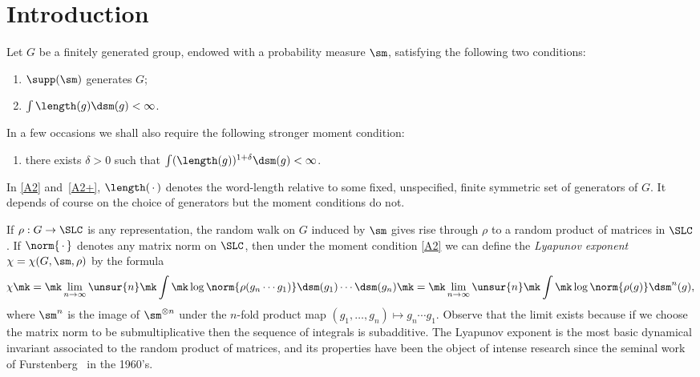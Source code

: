 \section*{Introduction}

Let $G$ be a finitely generated group, endowed with a probability measure $\sm$, satisfying the following two conditions:
\begin{enumerate}\renewcommand{\theenumi}{A\arabic{enumi}}
\item \label{A1} $\supp(\sm)$ generates $G$;
\item \label{A2} $ \int \length(g) \dsm(g)<\infty$.
\end{enumerate}
In a few occasions we shall also require the following stronger moment condition:
\begin{enumerate}\renewcommand{\theenumi}{A\arabic{enumi}${}^+$}\setcounter{enumi}{1}
\item \label{A2+} there exists $\delta >0$ such that $ \int (\length(g))^{1+\delta} \dsm(g)<\infty$.
\end{enumerate}
In \eqref{A2} and~\eqref{A2+}, $\length({\,\cdot\,})$ denotes the word-length relative to some fixed, unspecified, finite symmetric set of generators of $G$. It depends of course on the choice of generators but the moment conditions do not.


If $\rho:G \to \SLC$ is any representation, the random walk on $G$ induced by $\sm$ gives rise through $\rho$ to a random product of matrices in $\SLC$. If $\norm{{\,\cdot\,}}$ denotes any matrix norm on $\SLC$, then under the moment condition \eqref{A2} we can define the \emph{Lyapunov exponent} $\chi = \chi(G, \sm, \rho)$ by the formula
\begin{equation}
\label{def:lyapunov exponent intro}
\!\chi \mk=\mk \lim_{n\to\infty} \unsur{n} \mk\int\mk \log\norm{\rho(g_n\cdots g_1)} \dsm(g_1) \cdots \dsm(g_n) \mk=\mk \lim_{n\to\infty} \unsur{n} \mk\int\mk \log\norm{\rho(g)} \dsm^n(g),
\end{equation}
where $\sm^n$ is the image of $\sm^{\otimes n}$ under the $n$-fold product map $(g_1, \ldots, g_n)\mapsto g_n\cdots g_1$. Observe that the limit exists because if we choose the matrix norm to be submultiplicative then the sequence of integrals is subadditive. The Lyapunov exponent is the most basic dynamical invariant associated to the random product of matrices, and its properties have been the object of intense research since the seminal work of Furstenberg~\cite{furstenberg} in the 1960's.

